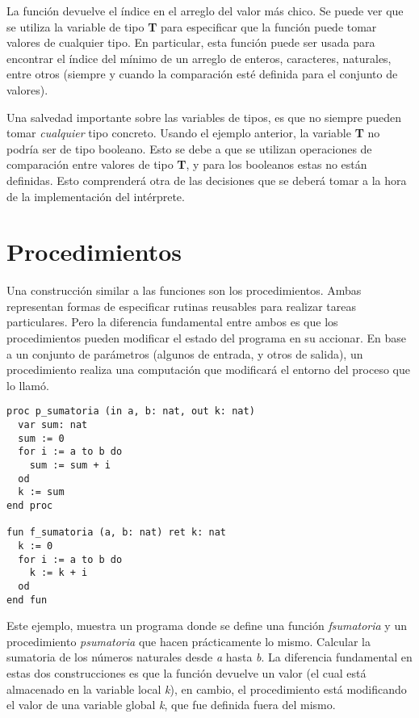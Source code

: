 \documentclass{article}
\begin{document}
La función devuelve el índice en el arreglo del valor más chico.
Se puede ver que se utiliza la variable de tipo \textbf{T} para especificar que la función puede tomar valores de cualquier tipo.
En particular, esta función puede ser usada para encontrar el índice del mínimo de un arreglo de enteros, caracteres, naturales, entre otros (siempre y cuando la comparación esté definida para el conjunto de valores).

Una salvedad importante sobre las variables de tipos, es que no siempre pueden tomar \textit{cualquier} tipo concreto.
Usando el ejemplo anterior, la variable \textbf{T} no podría ser de tipo booleano.
Esto se debe a que se utilizan operaciones de comparación entre valores de tipo \textbf{T}, y para los booleanos estas no están definidas.
Esto comprenderá otra de las decisiones que se deberá tomar a la hora de la implementación del intérprete.

\section{Procedimientos}

Una construcción similar a las funciones son los procedimientos.
Ambas representan formas de especificar rutinas reusables para realizar tareas particulares.
Pero la diferencia fundamental entre ambos es que los procedimientos pueden modificar el estado del programa en su accionar.
En base a un conjunto de parámetros (algunos de entrada, y otros de salida), un procedimiento realiza una computación que modificará el entorno del proceso que lo llamó.

\begin{lstlisting}
proc p_sumatoria (in a, b: nat, out k: nat)
  var sum: nat
  sum := 0
  for i := a to b do
    sum := sum + i
  od
  k := sum
end proc

fun f_sumatoria (a, b: nat) ret k: nat
  k := 0
  for i := a to b do
    k := k + i
  od
end fun
\end{lstlisting}

Este ejemplo, muestra un programa donde se define una función \textit{f\gbajo sumatoria} y un procedimiento \textit{p\gbajo sumatoria} que hacen prácticamente lo mismo.
Calcular la sumatoria de los números naturales desde \textit{a} hasta \textit{b}.
La diferencia fundamental en estas dos construcciones es que la función devuelve un valor (el cual está almacenado en la variable local \textit{k}), en cambio, el procedimiento está modificando el valor de una variable global \textit{k}, que fue definida fuera del mismo.
\end{document}
